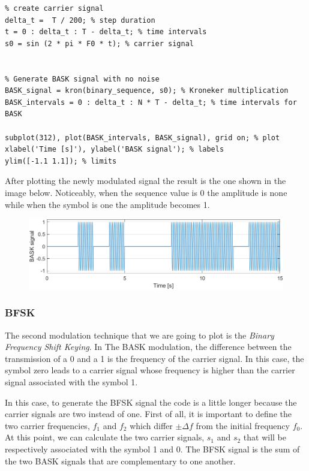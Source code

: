 \begin{lstlisting}
% create carrier signal
delta_t =  T / 200; % step duration
t = 0 : delta_t : T - delta_t; % time intervals
s0 = sin (2 * pi * F0 * t); % carrier signal


% Generate BASK signal with no noise
BASK_signal = kron(binary_sequence, s0); % Kroneker multiplication
BASK_intervals = 0 : delta_t : N * T - delta_t; % time intervals for BASK 

subplot(312), plot(BASK_intervals, BASK_signal), grid on; % plot
xlabel('Time [s]'), ylabel('BASK signal'); % labels
ylim([-1.1 1.1]); % limits
\end{lstlisting}

\noindent After plotting the newly modulated signal the result is the one shown in the image below. Noticeably, when the sequence value is 0 the amplitude is none while when the symbol is one the amplitude becomes 1.

\begin{figure}[!h]
    \centering
    \includegraphics[width = .7\textwidth]{lab-3/imgs/task2_BASK.png}
\end{figure}
\vspace*{-15px}

\subsubsection*{BFSK}
The second modulation technique that we are going to plot is the \textsl{Binary Frequency Shift Keying}. In The BASK modulation, the difference between the transmission of a 0 and a 1 is the frequency of the carrier signal. In this case, the symbol zero leads to a carrier signal whose frequency is higher than the carrier signal associated with the symbol 1. 

In this case, to generate the BFSK signal the code is a little longer because the carrier signals are two instead of one. First of all, it is important to define the two carrier frequencies, $f_1$ and $f_2$ which differ $\pm\Delta f$ from the initial frequency $f_0$. At this point, we can calculate the two carrier signals, $s_1$ and $s_2$ that will be respectively associated with the symbol 1 and 0. The BFSK signal is the sum of the two BASK signals that are complementary to one another.

